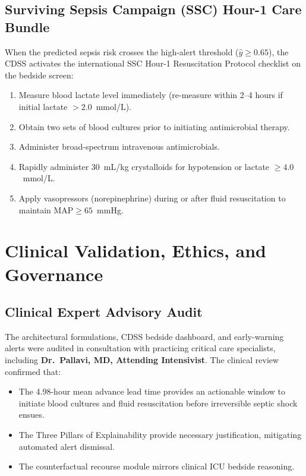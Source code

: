 \documentclass[journal,twocolumn,10pt]{IEEEtran}
\begin{document}
\subsection{Surviving Sepsis Campaign (SSC) Hour-1 Care Bundle}
When the predicted sepsis risk crosses the high-alert threshold ($\hat{y} \ge 0.65$), the CDSS activates the international SSC Hour-1 Resuscitation Protocol checklist on the bedside screen:
\begin{enumerate}
    \item Measure blood lactate level immediately (re-measure within 2--4 hours if initial lactate $>2.0$~mmol/L).
    \item Obtain two sets of blood cultures prior to initiating antimicrobial therapy.
    \item Administer broad-spectrum intravenous antimicrobials.
    \item Rapidly administer $30$~mL/kg crystalloids for hypotension or lactate $\ge 4.0$~mmol/L.
    \item Apply vasopressors (norepinephrine) during or after fluid resuscitation to maintain $\text{MAP} \ge 65$~mmHg.
\end{enumerate}

\section{Clinical Validation, Ethics, and Governance}
\subsection{Clinical Expert Advisory Audit}
The architectural formulations, CDSS bedside dashboard, and early-warning alerts were audited in consultation with practicing critical care specialists, including \textbf{Dr.~Pallavi, MD, Attending Intensivist}. The clinical review confirmed that:
\begin{itemize}
    \item The 4.98-hour mean advance lead time provides an actionable window to initiate blood cultures and fluid resuscitation before irreversible septic shock ensues.
    \item The Three Pillars of Explainability provide necessary justification, mitigating automated alert dismissal.
    \item The counterfactual recourse module mirrors clinical ICU bedside reasoning.
\end{itemize}
\end{document}
